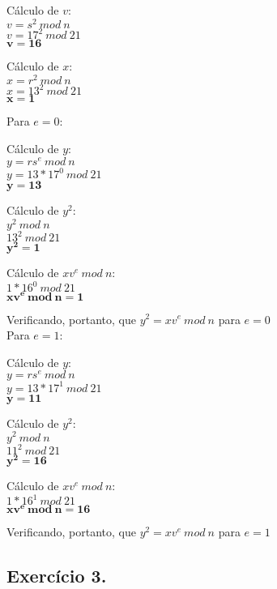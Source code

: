 \documentclass[12pt]{article}
\begin{document}
\begin{itemize}
\begin{center}
				\end{center}
				\begin{center}
					Cálculo de $v$:\\					
					$v = s^2 \ mod \ n$\\
					$v = 17^2 \ mod \ 21$\\
					$\mathbf{v = 16}$\\
				\end{center}
				\begin{center}
					Cálculo de $x$:\\					
					$x = r^2 \ mod \ n$\\
					$x = 13^2 \ mod \ 21$\\
					$\mathbf{x = 1}$\\
				\end{center}
				\newpage
				Para $e = 0$:
				\begin{center}
					Cálculo de $y$:\\					
					$y = rs^{e} \ mod \ n$\\
					$y = 13*17^{0} \ mod \ 21$\\					
					$\mathbf{y = 13}$\\
				\end{center}		
				\begin{center}
					Cálculo de $y^2$:\\					
					$y^2 \ mod \ n$\\
					$13^2 \ mod \ 21$\\
					$\mathbf{y^2 = 1}$\\
				\end{center}
				\begin{center}
					Cálculo de $xv^e \ mod \ n$:\\					
					$1*16^0 \ mod \ 21$\\
					$\mathbf{xv^e \ mod \ n = 1}$\\
				\end{center}
				Verificando, portanto, que $y^2 = xv^e \ mod \ n$ para $e = 0$\\
				Para $e = 1$:
				\begin{center}
					Cálculo de $y$:\\					
					$y = rs^{e} \ mod \ n$\\
					$y = 13*17^{1} \ mod \ 21$\\					
					$\mathbf{y = 11}$\\
				\end{center}		
				\begin{center}
					Cálculo de $y^2$:\\					
					$y^2 \ mod \ n$\\
					$11^2 \ mod \ 21$\\
					$\mathbf{y^2 = 16}$\\
				\end{center}
				\begin{center}
					Cálculo de $xv^e \ mod \ n$:\\					
					$1*16^1 \ mod \ 21$\\
					$\mathbf{xv^e \ mod \ n = 16}$\\
				\end{center}
				Verificando, portanto, que $y^2 = xv^e \ mod \ n$ para $e = 1$	
		\end{itemize}				
	\subsection*{Exercício 3.}
																					
\end{document}
